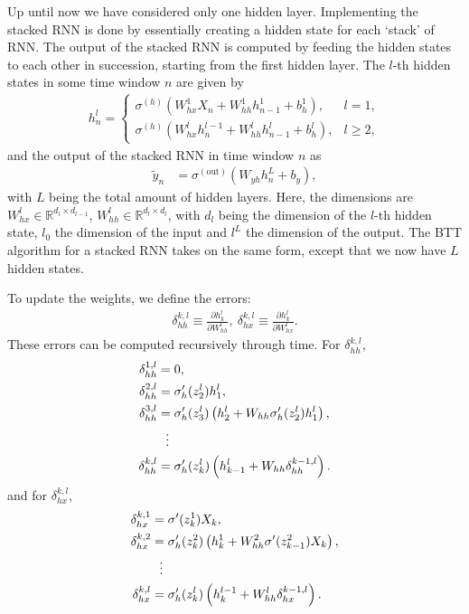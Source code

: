 \documentclass[%
reprint,
amsmath,amssymb,
aps,
]{revtex4-2}
\begin{document}
Up until now we have considered only one hidden layer. Implementing the stacked RNN is done by essentially creating a hidden state for each `stack' of RNN. The output of the stacked RNN is computed by feeding the hidden states to each other in succession, starting from the first hidden layer. The \(l\)-th hidden states in some time window \(n\) are given by
\begin{align}
	h^{l}_{n} = \begin{cases}
		\sigma^{(h)}\left( W_{hx}^{1}X_{n} + W_{hh}^{1}h_{n-1}^{1} + b_{h}^{1}\right), &l=1, \\
		\sigma^{(h)}\left( W_{hx}^{l}h_{n}^{l-1} + W_{hh}^{l}h_{n-1}^{l} + b_{h}^{l}\right), &l\geq 2,
	\end{cases}
\end{align}	
and the output of the stacked RNN in time window \(n\) as
\begin{align}
	\tilde{y}_{n} &= \sigma^{(\text{out})}\left( W_{yh}h^{L}_{n} + b_{y} \right),
\end{align}
with \(L\) being the total amount of hidden layers. 
Here, the dimensions are \(W^{l}_{hx}\in\mathbb{R}^{d_{l}\times d_{l-1}}\), \(W^{l}_{hh}\in\mathbb{R}^{d_{l}\times d_{l}}\), with \(d_l\) being the dimension of the \(l\)-th hidden state, \(l_0\) the dimension of the input and \(l^{L}\) the dimension of the output. The BTT algorithm for a stacked RNN takes on the same form, except that we now have \(L\) hidden states. 


To update the weights, we define the errors:
\begin{align}
	\delta^{k,l}_{hh}\equiv \frac{\partial h_{k}^{l}}{\partial W_{hh}^{l}}, \ \delta^{k,l}_{hx}\equiv \frac{\partial h_{k}^{l}}{\partial W_{hx}^{l}}.
\end{align}
These errors can be computed recursively through time. For \(\delta^{k,l}_{hh}\), 
\begin{align}
	\delta^{1,l}_{hh} &= 0, \notag\\
	\delta^{2,l}_{hh} &= \sigma'_{h}(z_2^{l}) h_1^{l},  \notag\\
	\delta^{3,l}_{hh} &= \sigma'_{h}(z_3^{l}) \left( h_2^{l} + W_{hh}\sigma'_{h}(z_2^{l})h_1^{l} \right), \\
	&\ \ \vdots \notag \\
	\delta^{k,l}_{hh} &= \sigma'_{h}(z_{k}^{l}) \left( h_{k-1}^{l} + W_{hh}\delta^{k-1,l}_{hh}\right).
\end{align}
and for \(\delta^{k,l}_{hx}\),
\begin{align}
	\delta^{k,1}_{hx} &= \sigma'(z_{k}^{1})X_{k}, \notag\\
	\delta^{k,2}_{hx} &= \sigma'_{h}(z_{k}^{2}) \left( h_{k}^{1} + W^{2}_{hh}\sigma'(z_{k-1}^{2})X_{k} \right),  \notag\\
	&\ \ \vdots \notag \\
	\delta^{k,l}_{hx} &= \sigma'_{h}(z_{k}^{l}) \left( h_{k}^{l-1} + W_{hh}^{l}\delta^{k-1,l}_{hx}\right).
\end{align}
\end{document}
